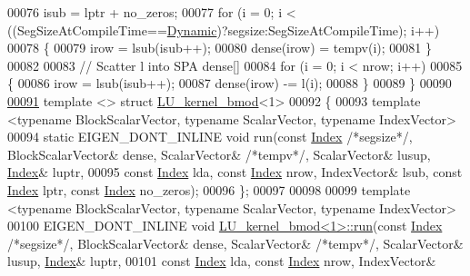 \begin{DoxyCode}
00076   isub = lptr + no\_zeros;
00077   \textcolor{keywordflow}{for} (i = 0; i < ((SegSizeAtCompileTime==\hyperlink{namespace_eigen_ad81fa7195215a0ce30017dfac309f0b2}{Dynamic})?segsize:SegSizeAtCompileTime); i++)
00078   \{
00079     irow = lsub(isub++); 
00080     dense(irow) = tempv(i);
00081   \}
00082   
00083   \textcolor{comment}{// Scatter l into SPA dense[]}
00084   \textcolor{keywordflow}{for} (i = 0; i < nrow; i++)
00085   \{
00086     irow = lsub(isub++); 
00087     dense(irow) -= l(i);
00088   \} 
00089 \}
00090 
\hyperlink{struct_eigen_1_1internal_1_1_l_u__kernel__bmod_3_011_01_4}{00091} \textcolor{keyword}{template} <> \textcolor{keyword}{struct }\hyperlink{struct_eigen_1_1internal_1_1_l_u__kernel__bmod}{LU\_kernel\_bmod}<1>
00092 \{
00093   \textcolor{keyword}{template} <\textcolor{keyword}{typename} BlockScalarVector, \textcolor{keyword}{typename} ScalarVector, \textcolor{keyword}{typename} IndexVector>
00094   \textcolor{keyword}{static} EIGEN\_DONT\_INLINE \textcolor{keywordtype}{void} run(\textcolor{keyword}{const} \hyperlink{namespace_eigen_a62e77e0933482dafde8fe197d9a2cfde}{Index} \textcolor{comment}{/*segsize*/}, BlockScalarVector& dense, ScalarVector& \textcolor{comment}{
      /*tempv*/}, ScalarVector& lusup, \hyperlink{namespace_eigen_a62e77e0933482dafde8fe197d9a2cfde}{Index}& luptr,
00095                                     \textcolor{keyword}{const} \hyperlink{namespace_eigen_a62e77e0933482dafde8fe197d9a2cfde}{Index} lda, \textcolor{keyword}{const} \hyperlink{namespace_eigen_a62e77e0933482dafde8fe197d9a2cfde}{Index} nrow, IndexVector& lsub, \textcolor{keyword}{const} 
      \hyperlink{namespace_eigen_a62e77e0933482dafde8fe197d9a2cfde}{Index} lptr, \textcolor{keyword}{const} \hyperlink{namespace_eigen_a62e77e0933482dafde8fe197d9a2cfde}{Index} no\_zeros);
00096 \};
00097 
00098 
00099 \textcolor{keyword}{template} <\textcolor{keyword}{typename} BlockScalarVector, \textcolor{keyword}{typename} ScalarVector, \textcolor{keyword}{typename} IndexVector>
00100 EIGEN\_DONT\_INLINE \textcolor{keywordtype}{void} \hyperlink{struct_eigen_1_1internal_1_1_l_u__kernel__bmod}{LU\_kernel\_bmod<1>::run}(\textcolor{keyword}{const} \hyperlink{namespace_eigen_a62e77e0933482dafde8fe197d9a2cfde}{Index} \textcolor{comment}{/*segsize*/}, 
      BlockScalarVector& dense, ScalarVector& \textcolor{comment}{/*tempv*/}, ScalarVector& lusup, \hyperlink{namespace_eigen_a62e77e0933482dafde8fe197d9a2cfde}{Index}& luptr,
00101                                               \textcolor{keyword}{const} \hyperlink{namespace_eigen_a62e77e0933482dafde8fe197d9a2cfde}{Index} lda, \textcolor{keyword}{const} \hyperlink{namespace_eigen_a62e77e0933482dafde8fe197d9a2cfde}{Index} nrow, IndexVector& 

\end{DoxyCode}
